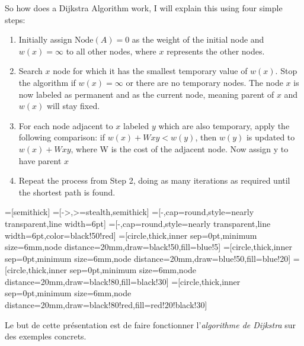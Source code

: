	So how does a Dijkstra Algorithm work, I will explain this using four simple steps:
	\begin{enumerate}
		\item Initially assign $\text{Node}(A) = 0$ as the weight of the initial node and $w(x) = \infty$ to all other nodes, where $x$ represents the other nodes.
		
		\item Search $x$ node for which it has the smallest temporary value of $w(x)$. Stop the algorithm if $w(x) = \infty$ or there are no temporary nodes. The node $x$ is now labeled as permanent and as the current node, meaning parent of $x$ and $w(x)$ will stay fixed.
		    
		\item For each node adjacent to $x$ labeled $y$ which are also temporary, apply the following comparison: 
		if $w(x) + Wxy < w(y)$, then $w(y)$ is updated to $w(x) + Wxy$, where W is the cost of the adjacent node. Now assign y to have parent $x$
		\item Repeat the process from Step 2, doing as many iterations as required until the shortest path is found. 
	\end{enumerate} 
	=[semithick] %
	=[->,>=stealth,semithick] %
	=[-,cap=round,style=nearly transparent,line width=6pt] %
	=[-,cap=round,style=nearly transparent,line width=6pt,color=black!50!red]
	 =[circle,thick,inner sep=0pt,minimum size=6mm,node distance=20mm,draw=black!50,fill=blue!5]
	=[circle,thick,inner sep=0pt,minimum size=6mm,node distance=20mm,draw=blue!50,fill=blue!20]
	   =[circle,thick,inner sep=0pt,minimum size=6mm,node distance=20mm,draw=black!80,fill=black!30]
	  =[circle,thick,inner sep=0pt,minimum size=6mm,node distance=20mm,draw=black!80!red,fill=red!20!black!30]
	
	Le but de cette présentation est de faire fonctionner l'{\em algorithme de Dijkstra} sur des exemples concrets.

